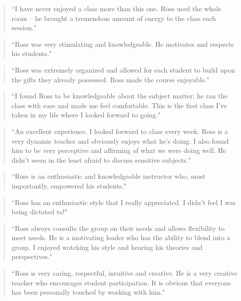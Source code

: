 \documentclass[10pt,DIV09,letterpaper,oneside,headsepline]{scrreprt}
\begin{document}
\begin{quote} ``I have never enjoyed a class more than this one. Ross used the whole room -- he brought a tremendous amount of energy to the class each session." \end{quote}

\begin{quote} ``Ross was very stimulating and knowledgeable. He motivates and respects his students." \end{quote}

\begin{quote} ``Ross was extremely organized and allowed for each student to build upon the gifts they already possessed. Ross made the course enjoyable." \end{quote}

\begin{quote} ``I found Ross to be knowledgeable about the subject matter; he ran the class with ease and made me feel comfortable. This is the first class I've taken in my life where I looked forward to going." \end{quote}

\begin{quote} ``An excellent experience. I looked forward to class every week. Ross is a very dynamic teacher and obviously enjoys what he's doing. I also found him to be very perceptive and affirming of what we were doing well. He didn't seem in the least afraid to discuss sensitive subjects." \end{quote}

\begin{quote} ``Ross is an enthusiastic and knowledgeable instructor who, most importantly, empowered his students." \end{quote}

\begin{quote} ``Ross has an enthusiastic style that I really appreciated. I didn't feel I was being dictated to!" \end{quote}

\begin{quote} ``Ross always consults the group on their needs and allows flexibility to meet needs. He is a motivating leader who has the ability to blend into a group. I enjoyed watching his style and hearing his theories and perspectives." \end{quote}

\begin{quote} ``Ross is very caring, respectful, intuitive and creative. He is a very creative teacher who encourages student participation. It is obvious that everyone has been personally touched by working with him." \end{quote}
\end{document}
